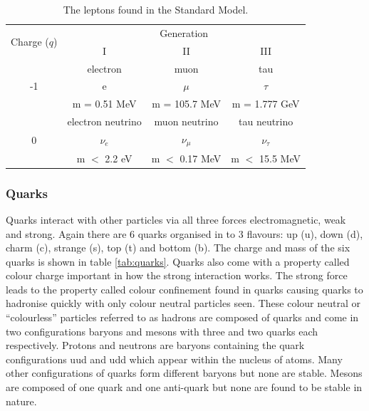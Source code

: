     \begin {table}[h]
        \begin{center}
        \begin{tabular}{|c|c|c|c|}
            \hline
            \multirow{2}{*}{Charge ($q$)}      & \multicolumn{3}{c|}{Generation} \\
            \cline{2-4}
                                & I     & II    & III   \\
            \hline
            \multirow{3}{*}{\Large -1} & electron & muon & tau \\
                                & {\Huge e}     & {\Huge $\mu$} & {\Huge $\tau$} \\
                                & m = 0.51 MeV  & m = 105.7 MeV & m = 1.777 GeV \\
            \hline
            \multirow{3}{*}{\Large 0} & electron neutrino & muon neutrino & tau neutrino \\
                                & {\Huge $\nu_{e}$} & {\Huge $\nu_{\mu}$} & {\Huge $\nu_{\tau}$}     \\
                                & m $<$ 2.2 eV      & m $<$ 0.17 MeV      & m $<$ 15.5 MeV \\
            \hline
        \end{tabular}
        \caption{The leptons found in the Standard Model.}
        \label{tab:leptons}
        \end{center}
    \end {table}
 
    \subsubsection*{Quarks}
    Quarks interact with other particles via all three forces electromagnetic, weak and strong. Again there are 6 quarks organised in to 3 flavours: up (u), down (d), charm (c), strange (s), top (t) and bottom (b). The charge and mass of the six quarks is shown in table \ref{tab:quarks}. Quarks also come with a property called colour charge important in how the strong interaction works. The strong force leads to the property called colour confinement found in quarks causing quarks to hadronise quickly with only colour neutral particles seen. These colour neutral or ``colourless'' particles referred to as hadrons are composed of quarks and come in two configurations baryons and mesons with three and two quarks each respectively. Protons and neutrons are baryons containing the quark configurations uud and udd which appear within the nucleus of atoms. Many other configurations of quarks form different baryons but none are stable. Mesons are composed of one quark and one anti-quark but none are found to be stable in nature. 

